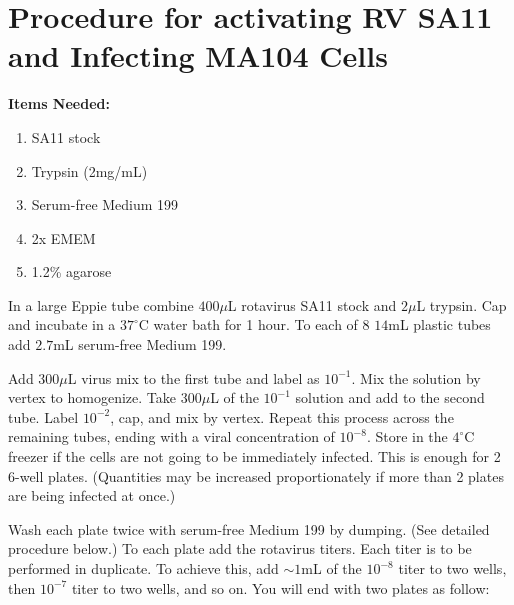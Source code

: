 \section{Procedure for activating RV SA11 and Infecting MA104 Cells}

{\bfseries Items Needed:} \begin{enumerate}
	\item SA11 stock
	\item Trypsin (2mg/mL)
	\item Serum-free Medium 199
	\item 2x EMEM
	\item 1.2\% agarose
\end{enumerate}

In a large Eppie tube combine $400\mu$L rotavirus SA11 stock and $2\mu$L trypsin. Cap and incubate in a $37^{\circ}$C water bath for 1 hour. To each of 8 $14$mL plastic tubes add $2.7$mL serum-free Medium 199.

Add $300\mu$L virus mix to the first tube and label as $10^{-1}$. Mix the solution by vertex to homogenize. Take $300\mu$L of the $10^{-1}$ solution and add to the second tube. Label $10^{-2}$, cap, and mix by vertex. Repeat this process across the remaining tubes, ending with a viral concentration of $10^{-8}$. Store in the $4^{\circ}$C freezer if the cells are not going to be immediately infected. This is enough for 2 6-well plates. (Quantities may be increased proportionately if more than 2 plates are being infected at once.)

Wash each plate twice with serum-free Medium 199 by dumping. (See detailed procedure below.) To each plate add the rotavirus titers. Each titer is to be performed in duplicate. To achieve this, add $\sim 1$mL of the $10^{-8}$ titer to two wells, then $10^{-7}$ titer to two wells, and so on. You will end with two plates as follow:

